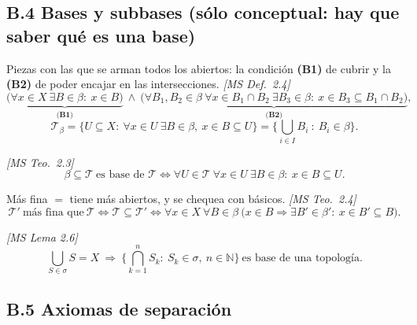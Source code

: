 \documentclass[11pt,a4paper]{article}
\theoremstyle{definition}
\theoremstyle{plain}
\newcommand{\fnt}[1]{{\normalfont\small\itshape\color{gray!150!black}[#1]}}
\newcommand{\N}{\mathbb{N}}
\newcommand{\tp}{\mathcal{T}}
\begin{document}
\subsection*{B.4 Bases y subbases \normalfont\small (sólo conceptual: hay que saber qué es una base)}

\begin{itemize}[leftmargin=1.3em,itemsep=3pt]

 Piezas con las que se arman todos los abiertos: la condición \textbf{(B1)} de cubrir y la \textbf{(B2)} de poder encajar en las intersecciones. \fnt{MS Def.\ 2.4}
\[ \underbrace{\big(\forall x\in X\ \exists B\in\beta:\ x\in B\big)}_{\textbf{(B1)}}\ \wedge\ \underbrace{\big(\forall B_1,B_2\in\beta\ \forall x\in B_1\cap B_2\ \exists B_3\in\beta:\ x\in B_3\subseteq B_1\cap B_2\big)}_{\textbf{(B2)}}, \]
\[ \tp_\beta=\{U\subseteq X:\ \forall x\in U\ \exists B\in\beta,\ x\in B\subseteq U\}=\Big\{\textstyle\bigcup_{i\in I}B_i\ :\ B_i\in\beta\Big\}. \]

 \fnt{MS Teo.\ 2.3}
\[ \beta\subseteq\tp\ \text{es base de }\tp\iff \forall U\in\tp\ \forall x\in U\ \exists B\in\beta:\ x\in B\subseteq U. \]

 Más fina $=$ tiene más abiertos, y se chequea con básicos. \fnt{MS Teo.\ 2.4}
\[ \tp'\ \text{más fina que}\ \tp\iff \tp\subseteq\tp'\iff \forall x\in X\ \forall B\in\beta\ \big(x\in B\Rightarrow \exists B'\in\beta':\ x\in B'\subseteq B\big). \]

 \fnt{MS Lema 2.6}
\[ \textstyle\bigcup_{S\in\sigma}S=X\ \Rightarrow\ \big\{\bigcap_{k=1}^{n}S_k:\ S_k\in\sigma,\ n\in\N\big\}\ \text{es base de una topología}. \]

\end{itemize}

\subsection*{B.5 Axiomas de separación}
\end{document}
